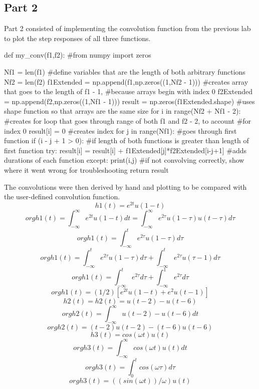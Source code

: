 \documentclass[12pt]{article}
\begin{document}
  \subsection{Part 2}
Part 2 consisted of implementing the convolution function from the previous lab to plot the step responses of all three functions.
\begin{python}
def my_conv(f1,f2):
    #from numpy import zeros
  
    Nf1 = len(f1) #define variables that are the length of both arbitrary functions
    Nf2 = len(f2)
    f1Extended = np.append(f1,np.zeros((1,Nf2 - 1))) #creates array that goes to the length of f1 - 1, 
    #because arrays begin with index 0
    f2Extended = np.append(f2,np.zeros((1,Nf1 - 1)))
    result = np.zeros(f1Extended.shape) #uses shape function so that arrays are the same size
    for i in range(Nf2 + Nf1 - 2):
    #creates for loop that goes through range of both f1 and f2 - 2, to account
                                   #for index 0
        result[i] = 0              #creates index
        for j in range(Nf1):       #goes through first function
            if (i - j + 1 > 0):    #if length of both functions is greater than length of first function
                try:
                    result[i] = result[i] + f1Extended[j]*f2Extended[i-j+1] 
                    #adds durations of each function
                except:
                    print(i,j) 
                    #if not convolving correctly, show where it went wrong for troubleshooting
    return result
\end{python}
The convolutions were then derived by hand and plotting to be compared with the user-defined convolution function.
\[h1(t) = e^{2t}u(1-t)\]
\[org h1(t) = \int_{-\infty}^{\infty} e^{2t}u(1-t) dt =\int_{-\infty}^{\infty} e^{2\tau}u(1-\tau)u(t-\tau) d\tau \]
\[org h1(t) = \int_{-\infty}^{t} e^{2\tau}u(1-\tau) d\tau\]
\[org h1(t) = \int_{-\infty}^{t} e^{2\tau}u(1-\tau)d\tau + \int_{-\infty}^{t} e^{2\tau}u(\tau-1)d\tau\]
\[org h1(t) = \int_{-\infty}^{t} e^{2\tau}d\tau + \int_{-\infty}^{1} e^{2\tau}d\tau\]
\[org h1(t) = (1/2)[e^{2t}u(1-t) + e^2u(t-1)]\]
\newline
\[h2(t) = h2(t)= u(t − 2) − u(t − 6)\]
\[org h2(t) = \int_{-\infty}^{\infty} u(t − 2) − u(t − 6) dt\]
\[org h2(t) = (t-2)u(t-2) - (t-6)u(t-6)\]
\newline
\[h3(t) = cos(\omega t) u(t)\]
\[org h3(t) = \int_{-\infty}^{\infty}cos(\omega t) u(t) dt\]
\[org h3(t) = \int_{0}^{t} cos(\omega \tau) d\tau\]
\[org h3(t) = ((sin(\omega t))/\omega) u(t)\]
\end{document}
